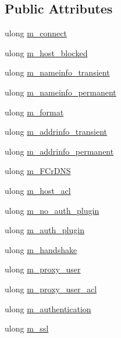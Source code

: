 \subsection*{Public Attributes}
\begin{DoxyCompactItemize}
\item 
ulong \mbox{\hyperlink{structHost__errors_aa13798b7397cebed0ceb140a5ec1c31b}{m\+\_\+connect}}
\item 
ulong \mbox{\hyperlink{structHost__errors_a08cddbf8345ff29409c7c85e40a75dc3}{m\+\_\+host\+\_\+blocked}}
\item 
ulong \mbox{\hyperlink{structHost__errors_a765883c9b207f3f374c2e59c93fa3766}{m\+\_\+nameinfo\+\_\+transient}}
\item 
ulong \mbox{\hyperlink{structHost__errors_aa6396784cee310f4f56c34b2fff76004}{m\+\_\+nameinfo\+\_\+permanent}}
\item 
ulong \mbox{\hyperlink{structHost__errors_aee77111dba1068af4d30d2bd0908a826}{m\+\_\+format}}
\item 
ulong \mbox{\hyperlink{structHost__errors_ae7a68b73f7cc9228e3415478a5b8bb04}{m\+\_\+addrinfo\+\_\+transient}}
\item 
ulong \mbox{\hyperlink{structHost__errors_adbf5d7d2d96265a5e858210bb225172f}{m\+\_\+addrinfo\+\_\+permanent}}
\item 
ulong \mbox{\hyperlink{structHost__errors_ab0c0b18a00ea73db8deedd2764ff2caa}{m\+\_\+\+F\+Cr\+D\+NS}}
\item 
ulong \mbox{\hyperlink{structHost__errors_ad34ae2239d8535aaabfa2f0b0a975fd7}{m\+\_\+host\+\_\+acl}}
\item 
ulong \mbox{\hyperlink{structHost__errors_ab890bb64d4eea0d0e94409c20e7400b3}{m\+\_\+no\+\_\+auth\+\_\+plugin}}
\item 
ulong \mbox{\hyperlink{structHost__errors_af4890a1d4a69c4b2082e892e79383516}{m\+\_\+auth\+\_\+plugin}}
\item 
ulong \mbox{\hyperlink{structHost__errors_a398364e965174f2f3ce9fed90d3a2764}{m\+\_\+handshake}}
\item 
ulong \mbox{\hyperlink{structHost__errors_abca3c5b0ad867f588ed7a5a77eeded44}{m\+\_\+proxy\+\_\+user}}
\item 
ulong \mbox{\hyperlink{structHost__errors_ac2b7908afa586f2d59134fe9f61ee544}{m\+\_\+proxy\+\_\+user\+\_\+acl}}
\item 
ulong \mbox{\hyperlink{structHost__errors_a2fe2e39e20a4487ba3b63318cbd039e3}{m\+\_\+authentication}}
\item 
ulong \mbox{\hyperlink{structHost__errors_ae9a0e76200a8529b329a5c14cd2abe97}{m\+\_\+ssl}}

\end{DoxyCompactItemize}

